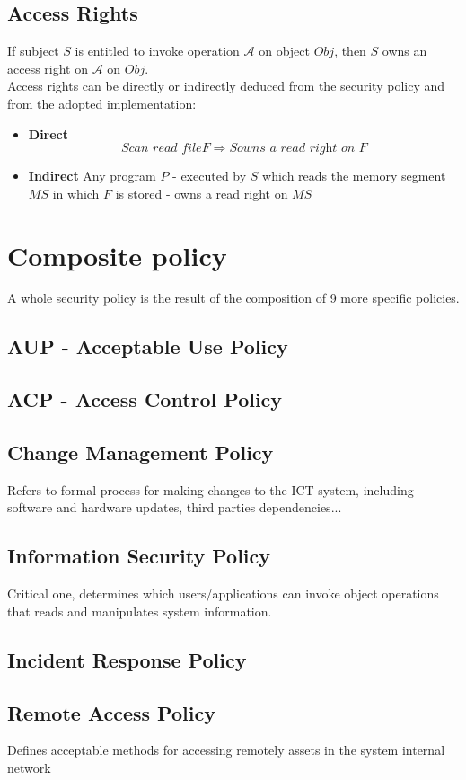 \subsection{Access Rights}
If subject $S$ is entitled to invoke operation $\mathcal{A}$ on object $Obj$, then $S$ owns an access right on $\mathcal{A}$ on $Obj$.\\
Access rights can be directly or indirectly deduced from the security policy and from the adopted implementation:
\begin{itemize}
    \item \textbf{Direct} 
    \[S \textit{can read file} F \Rightarrow S \textit{owns a read right on } F\]
    \item \textbf{Indirect}
    Any program $P$ {-} executed by $S$ which reads the memory segment $MS$ in which $F$ is stored {-} owns a read right on $MS$
\end{itemize}

\section{Composite policy}
A whole security policy is the result of the composition of 9 more specific policies.
\subsection{AUP - Acceptable Use Policy}
\subsection{ACP - Access Control Policy}
\subsection{Change Management Policy}
Refers to formal process for making changes to the ICT system,
including software and hardware updates, third parties dependencies...
\subsection{Information Security Policy}
Critical one, determines which users/applications can invoke object operations that reads and manipulates system information.
\subsection{Incident Response Policy}
\subsection{Remote Access Policy}
Defines acceptable methods for accessing remotely assets in the system internal network
